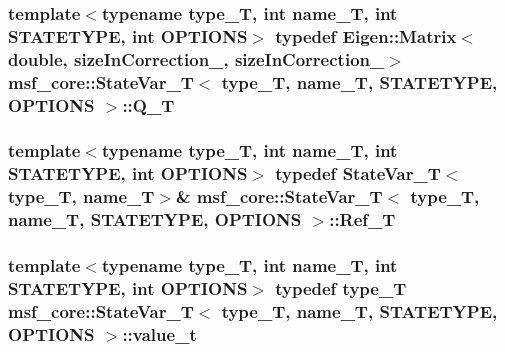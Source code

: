 \hypertarget{structmsf__core_1_1StateVar__T_a1f30ac85f0fd4307e50fd16377976626}{
\subsubsection[{Q\-\_\-\-T}]{\setlength{\rightskip}{0pt plus 5cm}template$<$typename type\-\_\-\-T, int name\-\_\-\-T, int S\-T\-A\-T\-E\-T\-Y\-P\-E, int O\-P\-T\-I\-O\-N\-S$>$ typedef Eigen\-::\-Matrix$<$double, {\bf size\-In\-Correction\-\_\-}, {\bf size\-In\-Correction\-\_\-}$>$ {\bf msf\-\_\-core\-::\-State\-Var\-\_\-\-T}$<$ type\-\_\-\-T, name\-\_\-\-T, S\-T\-A\-T\-E\-T\-Y\-P\-E, O\-P\-T\-I\-O\-N\-S $>$\-::{\bf Q\-\_\-\-T}}}\label{structmsf__core_1_1StateVar__T_a1f30ac85f0fd4307e50fd16377976626}
\hypertarget{structmsf__core_1_1StateVar__T_a96f0d72b7d31d6a33954400f53f4570d}{
\subsubsection[{Ref\-\_\-\-T}]{\setlength{\rightskip}{0pt plus 5cm}template$<$typename type\-\_\-\-T, int name\-\_\-\-T, int S\-T\-A\-T\-E\-T\-Y\-P\-E, int O\-P\-T\-I\-O\-N\-S$>$ typedef {\bf State\-Var\-\_\-\-T}$<$type\-\_\-\-T, name\-\_\-\-T$>$\& {\bf msf\-\_\-core\-::\-State\-Var\-\_\-\-T}$<$ type\-\_\-\-T, name\-\_\-\-T, S\-T\-A\-T\-E\-T\-Y\-P\-E, O\-P\-T\-I\-O\-N\-S $>$\-::{\bf Ref\-\_\-\-T}}}\label{structmsf__core_1_1StateVar__T_a96f0d72b7d31d6a33954400f53f4570d}
\hypertarget{structmsf__core_1_1StateVar__T_a4b17a26648ef87fe426df62f973e1b16}{
\subsubsection[{value\-\_\-t}]{\setlength{\rightskip}{0pt plus 5cm}template$<$typename type\-\_\-\-T, int name\-\_\-\-T, int S\-T\-A\-T\-E\-T\-Y\-P\-E, int O\-P\-T\-I\-O\-N\-S$>$ typedef type\-\_\-\-T {\bf msf\-\_\-core\-::\-State\-Var\-\_\-\-T}$<$ type\-\_\-\-T, name\-\_\-\-T, S\-T\-A\-T\-E\-T\-Y\-P\-E, O\-P\-T\-I\-O\-N\-S $>$\-::{\bf value\-\_\-t}}}\label{structmsf__core_1_1StateVar__T_a4b17a26648ef87fe426df62f973e1b16}



